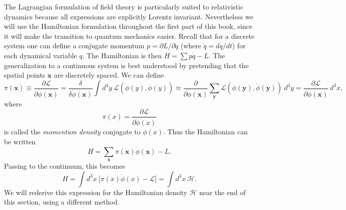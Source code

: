 The Lagrangian formulation of field theory is particularly suited to
relativistic dynamics because all expressions are explicitly Lorentz
invariant.  Nevertheless we will use the Hamiltonian formulation
throughout the first part of this book, since it will make the transition
to quantum mechanics easier.  Recall that for a discrete system one can
define a conjugate momentum $p = \partial L/\partial\dot{q}$ (where
$\dot{q} = dq/dt$) for each dynamical variable $q$.  The Hamiltonian is
then $H = \sum p\dot{q} - L$.  The generalization to a continuous system
is best understood by pretending that the spatial points $\mathbf{x}$ are
discretely spaced.  We can define
\begin{equation}
  \pi(\mathbf{x}) \equiv \frac{\partial\mathcal{L}}
    {\partial\dot{\phi}(\mathbf{x})}
  = \frac{\delta}{\delta\dot{\phi}(\mathbf{x})}
    \int d^3y\ \mathcal{L}(\phi(y), \dot{\phi}(y))
  \approx \frac{\partial}{\partial\dot{\phi}(\mathbf{x})}
    \sum_{\mathbf{y}} \mathcal{L}(\phi(\mathbf{y}), \dot{\phi}(\mathbf{y}))
    \ d^3y = \frac{\partial\mathcal{L}}{\partial\dot{\phi}(\mathbf{x})}\ d^3x,
  \label{eq:2.4}
\end{equation}
where
\begin{equation}
  \pi(x) = \frac{\partial\mathcal{L}}{\partial\dot{\phi}(x)}
\end{equation}
is called the \emph{momentum density} conjugate to $\phi(x)$.  Thus the
Hamiltonian can be written
\begin{equation}
  H = \sum_{\mathbf{x}} \pi(\mathbf{x})\dot{\phi}(\mathbf{x}) - L .
\end{equation}
Passing to the continuum, this becomes
\begin{equation}
  H = \int d^3x\ \bigl[ \pi(x)\dot{\phi}(x) - \mathcal{L} \bigr]
    = \int d^3x\ \mathcal{H} .
  \label{eq:2.5}
\end{equation}
We will rederive this expression for the Hamiltonian density $\mathcal{H}$
near the end of this section, using a different method.


